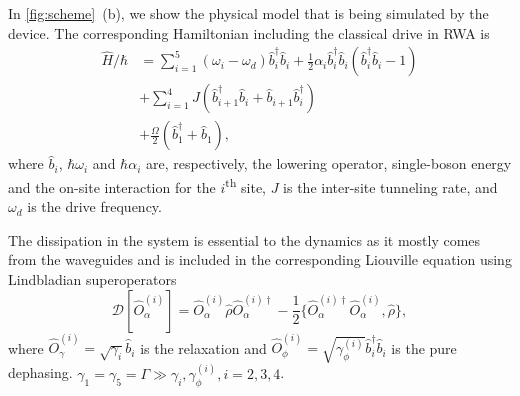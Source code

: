 \documentclass[%
 aps, pra,
 amsmath,amssymb,
 reprint,%
superscriptaddress
]{revtex4-2}
\begin{document}
In \autoref{fig:scheme}~(b), we show the physical model that is being simulated by the device. The corresponding Hamiltonian including the classical drive in RWA is
\begin{equation}
\begin{aligned}
\hat H/\hbar &= \sum_{i=1}^5 (\omega_i - \omega_d) \hat b^\dag_i \hat b_i + \frac{1}{2} \alpha_i \hat b_i^\dag \hat b_i (\hat b^\dag_i \hat b_i - 1)\\
&+\sum_{i=1}^4 J (\hat b^\dag_{i+1} \hat b_i + \hat b_{i+1} \hat b_i^\dag) \\
&+\frac{\Omega}{2}(\hat b_1^\dag + \hat b_1),
\end{aligned}\label{eq:bose-hubbard}
\end{equation} 
where $\hat b_i$, $\hbar \omega_i$ and $\hbar\alpha_i$ are, respectively, the lowering operator, single-boson energy and the on-site interaction for the $i$\textsuperscript{th} site, $J$ is the inter-site tunneling rate, and $\omega_d$ is the drive frequency.

The dissipation in the system is essential to the dynamics as it mostly comes from the waveguides and is included in the corresponding Liouville equation using Lindbladian superoperators 
\begin{equation}
	\mathcal D[\hat{O}^{(i)}_\alpha] = \hat{O}^{(i)}_\alpha \hat \rho \hat{O}^{(i)\dag}_\alpha - \frac{1}{2}\{\hat{O}^{(i)\dag}_\alpha \hat{O}^{(i)}_\alpha, \hat \rho\},
\end{equation}
where $\hat{O}^{(i)}_\gamma = \sqrt{\gamma_i} \hat b_i$ is the relaxation and $\hat{O}^{(i)}_\phi = \sqrt{\gamma^{(i)}_\phi} \hat b_i^\dag \hat b_i$ is the pure dephasing. $\gamma_1 = \gamma_5 = \Gamma \gg \gamma_i, \gamma_\phi^{(i)}, i=2,3,4$.
\end{document}
